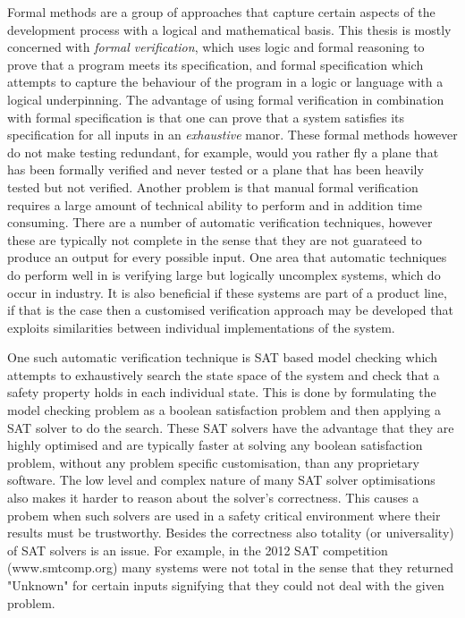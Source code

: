 Formal methods are a group of approaches that capture certain aspects of the development process with a logical and mathematical basis. This thesis is mostly concerned with \emph{formal verification}, which uses logic and formal reasoning to prove that a program meets its specification, and formal specification which attempts to capture the behaviour of the program in a logic or language with a logical underpinning. The advantage of using formal verification in combination with formal specification is that one can prove that a system satisfies its specification for all inputs in an \emph{exhaustive} manor. These formal methods however do not make testing redundant, for example, would you rather fly a plane that has been formally verified and never tested or a plane that has been heavily tested but not verified. Another problem is that manual formal verification requires a large amount of technical ability to perform and in addition time consuming. There are a number of automatic verification techniques, however these are typically not complete in the sense that they are not guarateed to produce an output for every possible input. One area that automatic techniques do perform well in is verifying large but logically uncomplex systems, which do occur in industry. It is also beneficial if these systems are part of a product line, if that is the case then a customised verification approach may be developed that exploits similarities between individual implementations of the system.

One such automatic verification technique is SAT based model checking which attempts to exhaustively search the state space of the system and check that a safety property holds in each individual state. This is done by formulating the model checking problem as a boolean satisfaction problem and then applying a SAT solver to do the search. These SAT solvers have the advantage that they are highly optimised and are typically faster at solving any boolean satisfaction problem, without any problem specific customisation, than any proprietary software. The low level and complex nature of many SAT solver optimisations also makes it harder to reason about the solver's correctness. This causes a probem when such solvers are used in a safety critical environment where their results must be trustworthy. Besides the correctness also
totality (or universality) of SAT solvers is an issue. For example, in the 2012 SAT competition (www.smtcomp.org) many systems were not total in the sense that they returned
"Unknown" for certain inputs signifying that they could not deal with the given problem. 


